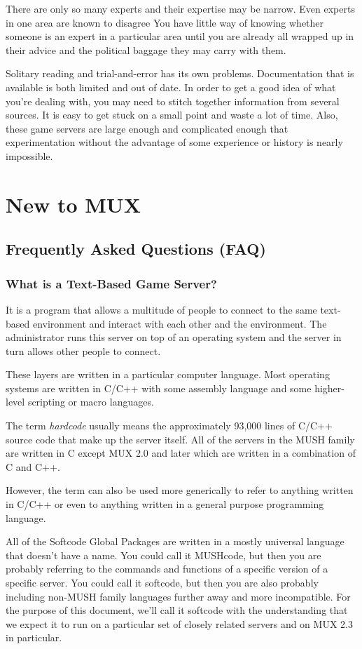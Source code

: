\documentclass[dvips]{book}
\begin{document}
There are only so many experts and their expertise may be narrow. Even experts
in one area are known to disagree
You have little way of knowing whether
someone is an expert in a particular area until you are already all
wrapped up in their advice and the political baggage they may carry with them.

Solitary reading and trial-and-error has its own problems. Documentation that
is available is both limited and out of date. In order to get a good idea of
what you're dealing with, you may need to stitch together information from
several
sources. It is easy to get stuck on a small point and waste a lot of time.
Also, these game servers are large enough and complicated enough that
experimentation without the advantage of some experience or history is
nearly impossible.
\chapter{New to MUX}
\section{Frequently Asked Questions (FAQ)}
\subsection{What is a Text-Based Game Server?}
It is a program that allows a multitude of people to connect to the same
text-based environment and interact with each other and the environment.
The administrator runs this server on top of an operating system and the server
in turn allows other people to connect. %

These layers are written in a particular computer language.
Most operating systems are written in C/C++ with some assembly language
and some higher-level scripting or macro languages.

The term \emph{hardcode} usually means the approximately 93,000 lines of C/C++
source code that make up the server itself.
All of the servers in the MUSH family are written in C except MUX 2.0 and later
which are written in a combination of C and C++.

However, the term can also be used more generically to refer to anything
written in C/C++ or even to anything written in a general purpose programming
language.

All of the Softcode Global Packages are written in a mostly universal language
that doesn't have a name. You could call it MUSHcode, but then you are probably
referring to the commands and functions of a specific version of a specific
server. You could call
it softcode, but then you are also probably including non-MUSH family languages
further away and more incompatible. For the purpose of this document, we'll
call it softcode with the understanding that we expect it to run on a particular
set of closely related servers and on MUX 2.3 in particular.
\end{document}
